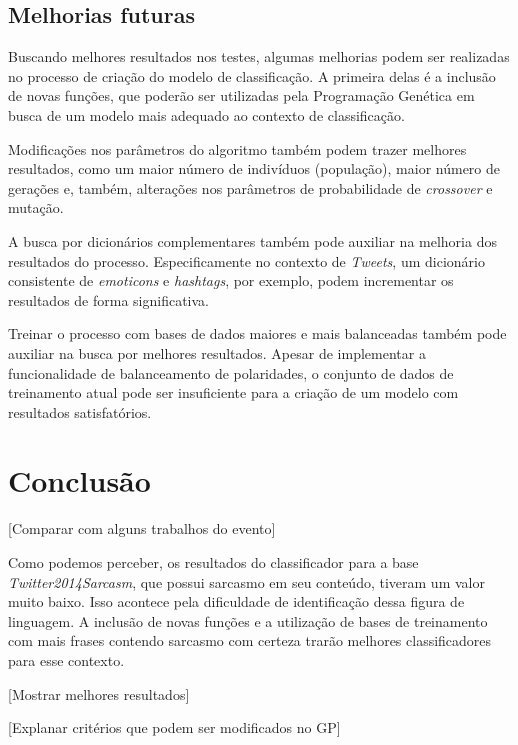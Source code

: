 \documentclass[12pt]{article}
\begin{document}
\subsection{Melhorias futuras}

Buscando melhores resultados nos testes, algumas melhorias podem ser realizadas no processo de criação do modelo de classificação. A primeira delas é a inclusão de novas funções, que poderão ser utilizadas pela Programação Genética em busca de um modelo mais adequado ao contexto de classificação. 

Modificações nos parâmetros do algoritmo também podem trazer melhores resultados, como um maior número de indivíduos (população), maior número de gerações e, também, alterações nos parâmetros de probabilidade de \emph{crossover} e mutação.

A busca por dicionários complementares também pode auxiliar na melhoria dos resultados do processo. Especificamente no contexto de \emph{Tweets}, um dicionário consistente de \emph{emoticons} e \emph{hashtags}, por exemplo, podem incrementar os resultados de forma significativa.

Treinar o processo com bases de dados maiores e mais balanceadas também pode auxiliar na busca por melhores resultados. Apesar de implementar a funcionalidade de balanceamento de polaridades, o conjunto de dados de treinamento atual pode ser insuficiente para a criação de um modelo com resultados satisfatórios.

\section{Conclusão}\label{conclusion}

[Comparar com alguns trabalhos do evento]

Como podemos perceber, os resultados do classificador para a base \emph{Twitter2014Sarcasm}, que possui sarcasmo em seu conteúdo, tiveram um valor muito baixo. Isso acontece pela dificuldade de identificação dessa figura de linguagem. A inclusão de novas funções e a utilização de bases de treinamento com mais frases contendo sarcasmo com certeza trarão melhores classificadores para esse contexto.

[Mostrar melhores resultados]

[Explanar critérios que podem ser modificados no GP]






\end{document}
